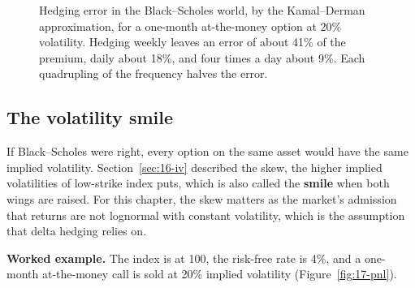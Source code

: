 \begin{figure}[htbp]
\centering
{}
\caption{Hedging error in the Black--Scholes world, by the Kamal--Derman approximation, for a one-month at-the-money option at 20\% volatility. Hedging weekly leaves an error of about 41\% of the premium, daily about 18\%, and four times a day about 9\%. Each quadrupling of the frequency halves the error.}
\label{fig:17-freq}
\end{figure}

\subsection{The volatility smile}

If Black--Scholes were right, every option on the same asset would have the same implied volatility. Section~\ref{sec:16-iv} described the skew, the higher implied volatilities of low-strike index puts, which is also called the \textbf{smile} when both wings are raised. For this chapter, the skew matters as the market's admission that returns are not lognormal with constant volatility, which is the assumption that delta hedging relies on.

\textbf{Worked example.} The index is at 100, the risk-free rate is 4\%, and a one-month at-the-money call is sold at 20\% implied volatility (Figure~\ref{fig:17-pnl}).

